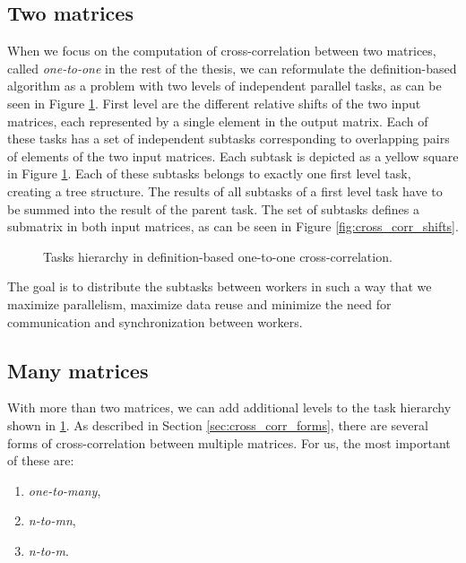 \subsection{Two matrices}
When we focus on the computation of cross-correlation between two matrices, called \textit{one-to-one} in the rest of the thesis, we can reformulate the definition-based algorithm as a problem with two levels of independent parallel tasks, as can be seen in Figure \ref{fig:cross_corr_one_to_one_tasks}. First level are the different relative shifts of the two input matrices, each represented by a single element in the output matrix. Each of these tasks has a set of independent subtasks corresponding to overlapping pairs of elements of the two input matrices. Each subtask is depicted as a yellow square in Figure \ref{fig:cross_corr_one_to_one_tasks}. Each of these subtasks belongs to exactly one first level task, creating a tree structure. The results of all subtasks of a first level task have to be summed into the result of the parent task. The set of subtasks defines a submatrix in both input matrices, as can be seen in Figure \ref{fig:cross_corr_shifts}.

\begin{figure}[ht]
	\centering
	\def\svgwidth{\textwidth}
	
	\caption{Tasks hierarchy in definition-based one-to-one cross-correlation.}
	\label{fig:cross_corr_one_to_one_tasks}
\end{figure}

The goal is to distribute the subtasks between workers in such a way that we maximize parallelism, maximize data reuse and minimize the need for communication and synchronization between workers.

\subsection{Many matrices}

With more than two matrices, we can add additional levels to the task hierarchy shown in \ref{fig:cross_corr_one_to_one_tasks}. As described in Section \ref{sec:cross_corr_forms}, there are several forms of cross-correlation between multiple matrices. For us, the most important of these are:
\begin{enumerate}
	\item \textit{one-to-many},
	\item \textit{n-to-mn},
	\item \textit{n-to-m}.
\end{enumerate}

